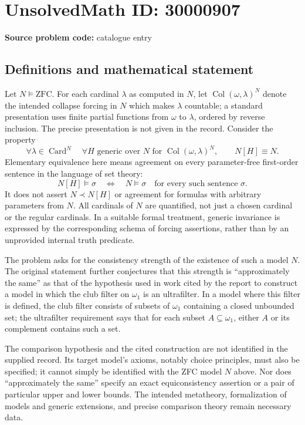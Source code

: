 \documentclass[11pt]{article}
\begin{document}
\section*{UnsolvedMath ID: 30000907}
\textbf{Source problem code:} catalogue entry
\subsection{Definitions and mathematical statement}
Let $N\models\mathrm{ZFC}$. For each cardinal $\lambda$ as computed in $N$, let $\operatorname{Col}(\omega,\lambda)^N$ denote the intended collapse forcing in $N$ which makes $\lambda$ countable; a standard presentation uses finite partial functions from $\omega$ to $\lambda$, ordered by reverse inclusion. The precise presentation is not given in the record. Consider the property
\[
\forall\lambda\in\operatorname{Card}^N\quad
\forall H\text{ generic over }N\text{ for }\operatorname{Col}(\omega,\lambda)^N,
\qquad N[H]\equiv N.
\]
Elementary equivalence here means agreement on every parameter-free first-order sentence in the language of set theory:
\[
N[H]\models\sigma\quad\Longleftrightarrow\quad N\models\sigma
\quad\text{for every such sentence }\sigma.
\]
It does not assert $N\prec N[H]$ or agreement for formulas with arbitrary parameters from $N$. All cardinals of $N$ are quantified, not just a chosen cardinal or the regular cardinals. In a suitable formal treatment, generic invariance is expressed by the corresponding schema of forcing assertions, rather than by an unprovided internal truth predicate.

The problem asks for the consistency strength of the existence of such a model $N$. The original statement further conjectures that this strength is ``approximately the same'' as that of the hypothesis used in work cited by the report to construct a model in which the club filter on $\omega_1$ is an ultrafilter. In a model where this filter is defined, the club filter consists of subsets of $\omega_1$ containing a closed unbounded set; the ultrafilter requirement says that for each subset $A\subseteq\omega_1$, either $A$ or its complement contains such a set.

The comparison hypothesis and the cited construction are not identified in the supplied record. Its target model's axioms, notably choice principles, must also be specified; it cannot simply be identified with the ZFC model $N$ above. Nor does ``approximately the same'' specify an exact equiconsistency assertion or a pair of particular upper and lower bounds. The intended metatheory, formalization of models and generic extensions, and precise comparison theory remain necessary data.
\end{document}
